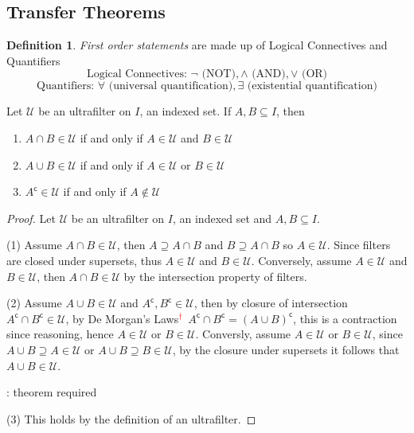 \documentclass{maatext}
\theoremstyle{definition}
\newtheorem{definition}[theorem]{Definition}
\theoremstyle{remark}
\numberwithin{section}{chapter}
\numberwithin{equation}{chapter}
\begin{document}
\subsection{Transfer Theorems}
\begin{definition}
\textit{First order statements} are made up of Logical Connectives and Quantifiers
$$\text{Logical Connectives: } \neg \text{ (NOT)}  , \wedge \text{ (AND)}, \vee \text{ (OR)}$$
$$\text{Quantifiers: } \forall \text{ (universal quantification)}  , \exists \text{ (existential quantification)}$$
\end{definition}

Let $\mathscr{U}$ be an ultrafilter on $I$, an indexed set. If $A,B\subseteq I$, then
\begin{enumerate}
\item $A \cap B \in \mathscr{U}$ if and only if $A \in \mathscr{U}$ and $B \in \mathscr{U}$
\item $A \cup B \in \mathscr{U}$ if and only if $A \in \mathscr{U}$ or $B \in \mathscr{U}$
\item $A^\mathsf{c} \in \mathscr{U}$ if and only if $A \not\in \mathscr{U}$
\end{enumerate}

\begin{proof}
Let $\mathscr{U}$ be an ultrafilter on $I$, an indexed set and $A,B\subseteq I$.

(1) Assume $A \cap B \in \mathscr{U}$, then $A \supseteq A \cap B$ and $B \supseteq A \cap B$ so $A \in \mathscr{U}$. Since filters are closed under supersets, thus $A \in \mathscr{U}$ and $B \in \mathscr{U}$. Conversely, assume $A \in \mathscr{U}$ and $B \in \mathscr{U}$, then $A \cap B \in \mathscr{U}$ by the intersection property of filters.

(2) Assume $A \cup B \in \mathscr{U}$ and $A^\mathsf{c}, B^\mathsf{c} \in \mathscr{U}$, then by closure of intersection $A^\mathsf{c} \cap B^\mathsf{c} \in \mathscr{U}$, by De Morgan's Laws${\color{red}^\dagger}$ $A^\mathsf{c} \cap B^\mathsf{c} = (A \cup B)^\mathsf{c}$, this is a contraction since {\color{red} reasoning}, hence  $A \in \mathscr{U}$ or $B \in \mathscr{U}$. Conversly, assume $A \in \mathscr{U}$ or $B \in \mathscr{U}$, since $A \cup B \supseteq A \in \mathscr{U}$ or $A \cup B \supseteq B \in \mathscr{U}$, by the closure under supersets it follows that $A \cup B \in \mathscr{U}$.
\begin{center} \color{red} \textdagger : theorem required\end{center}

(3) This holds by the definition of an ultrafilter.
\end{proof}
\end{document}
